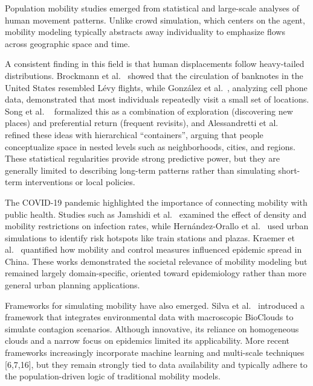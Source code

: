 \documentclass[pdflatex,sn-mathphys-num]{sn-jnl}%
\newcommand\blue[1]{#1}
\theoremstyle{thmstyleone}%
\theoremstyle{thmstyletwo}%
\theoremstyle{thmstylethree}%
\begin{document}
\blue{Population mobility studies emerged from statistical and large-scale analyses of human movement patterns. Unlike crowd simulation, which centers on the agent, mobility modeling typically abstracts away individuality to emphasize flows across geographic space and time.

A consistent finding in this field is that human displacements follow heavy-tailed distributions. Brockmann et al.~\citep{brockmann2006scaling} showed that the circulation of banknotes in the United States resembled Lévy flights, while González et al.~\citep{gonzalez2008understanding}, analyzing cell phone data, demonstrated that most individuals repeatedly visit a small set of locations. Song et al. ~\citep{natureSong2010exploration}  formalized this as a combination of exploration (discovering new places) and preferential return (frequent revisits), and Alessandretti et al.~\citep{alessandretti2020nature} refined these ideas with hierarchical ``containers'', arguing that people conceptualize space in nested levels such as neighborhoods, cities, and regions. These statistical regularities provide strong predictive power, but they are generally limited to describing long-term patterns rather than simulating short-term interventions or local policies.

The COVID-19 pandemic highlighted the importance of connecting mobility with public health. Studies such as Jamshidi et al.~\citep{jamshidi2020global} examined the effect of density and mobility restrictions on infection rates, while Hernández-Orallo et al.~\citep{hernandez2021human} used urban simulations to identify risk hotspots like train stations and plazas. Kraemer et al.~\citep{natureKramer2020mobilityCovid} quantified how mobility and control measures influenced epidemic spread in China. These works demonstrated the societal relevance of mobility modeling but remained largely domain-specific, oriented toward epidemiology rather than more general urban planning applications.

Frameworks for simulating mobility have also emerged. Silva et al.~\citep{silva2020lodus} introduced a framework that integrates environmental data with macroscopic BioClouds to simulate contagion scenarios. Although innovative, its reliance on homogeneous clouds and a narrow focus on epidemics limited its applicability. More recent frameworks increasingly incorporate machine learning and multi-scale techniques [6,7,16], but they remain strongly tied to data availability and typically adhere to the population-driven logic of traditional mobility models.

}
\end{document}
